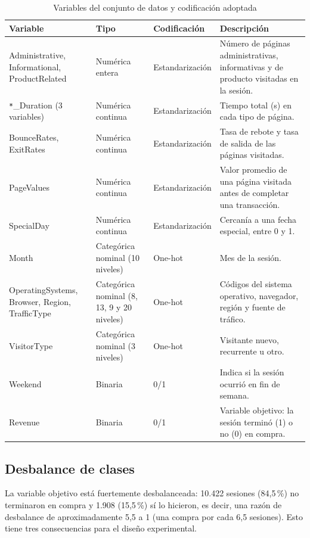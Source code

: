 \documentclass[conference]{IEEEtran}
\begin{document}
\begin{table}[!t]
\centering
\caption{Variables del conjunto de datos y codificación adoptada}
\label{tab:vars}
\small
\begin{tabular}{@{}p{3.0cm}p{2.5cm}p{2.5cm}p{7.4cm}@{}}
\toprule
Variable & Tipo & Codificación & Descripción \\
\midrule
Administrative, Informational, ProductRelated & Numérica entera & Estandarización & Número de páginas administrativas, informativas y de producto visitadas en la sesión. \\
\texttt{*}\_Duration (3 variables) & Numérica continua & Estandarización & Tiempo total (s) en cada tipo de página. \\
BounceRates, ExitRates & Numérica continua & Estandarización & Tasa de rebote y tasa de salida de las páginas visitadas. \\
PageValues & Numérica continua & Estandarización & Valor promedio de una página visitada antes de completar una transacción. \\
SpecialDay & Numérica continua & Estandarización & Cercanía a una fecha especial, entre 0 y 1. \\
Month & Categórica nominal (10 niveles) & One-hot & Mes de la sesión. \\
OperatingSystems, Browser, Region, TrafficType & Categórica nominal (8, 13, 9 y 20 niveles) & One-hot & Códigos del sistema operativo, navegador, región y fuente de tráfico. \\
VisitorType & Categórica nominal (3 niveles) & One-hot & Visitante nuevo, recurrente u otro. \\
Weekend & Binaria & 0/1 & Indica si la sesión ocurrió en fin de semana. \\
Revenue & Binaria & 0/1 & Variable objetivo: la sesión terminó (1) o no (0) en compra. \\
\bottomrule
\end{tabular}
\end{table}

\subsection{Desbalance de clases}
\label{sec:desb}
La variable objetivo está fuertemente desbalanceada: 10.422 sesiones (84,5\,\%) no terminaron en compra y 1.908 (15,5\,\%) sí lo hicieron, es decir, una razón de desbalance de aproximadamente 5,5 a 1 (una compra por cada 6,5 sesiones). Esto tiene tres consecuencias para el diseño experimental.
\end{document}
